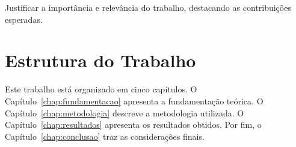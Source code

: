 Justificar a importância e relevância do trabalho, destacando as
contribuições esperadas.

\section{Estrutura do Trabalho}

Este trabalho está organizado em cinco capítulos. O Capítulo~\ref{chap:fundamentacao}
apresenta a fundamentação teórica. O Capítulo~\ref{chap:metodologia} descreve
a metodologia utilizada. O Capítulo~\ref{chap:resultados} apresenta os
resultados obtidos. Por fim, o Capítulo~\ref{chap:conclusao} traz as
considerações finais.
